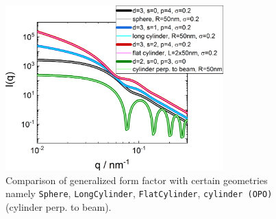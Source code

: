 \begin{figure}[hbt]
\begin{center}
\includegraphics[width=0.75\textwidth]{../images/form_factor/gFF/gFF.png}
\end{center}
\caption{Comparison of generalized form factor with certain geometries namely \texttt{Sphere}, \texttt{LongCylinder}, \texttt{FlatCylinder}, \texttt{cylinder (OPO)} (cylinder perp. to beam).} \label{fig:gFFIQ}
\end{figure}